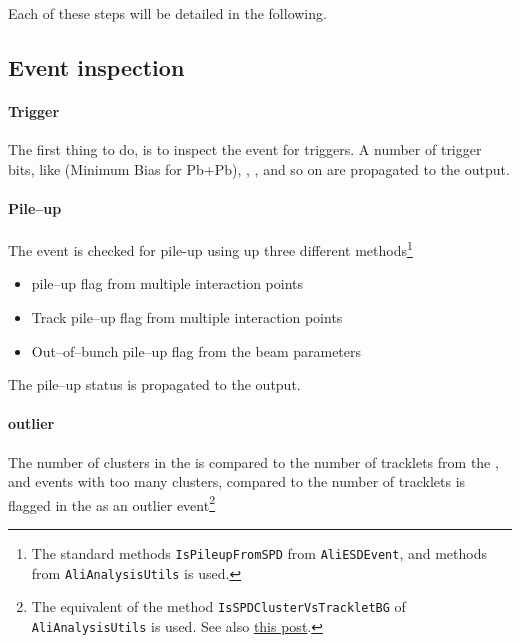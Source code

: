 Each of these steps will be detailed in the following. 

\subsection{Event inspection}
\label{sec:sub:event_inspection}

\paragraph{Trigger} 
The first thing to do, is to inspect the event for triggers.  A number
of trigger bits, like \INEL{} (Minimum Bias for Pb+Pb), \INELONE{},
\NSD{}, and so on are propagated to the \AOD{} output.

\paragraph{Pile--up} 
The event is checked for pile-up using up three different
methods\footnote{The standard methods \texttt{IsPileupFromSPD} from
  \texttt{AliESDEvent}, and methods from \texttt{AliAnalysisUtils} is
  used.} 
\begin{itemize}
\item \SPD{} pile--up flag from multiple interaction points
\item Track pile--up flag from multiple interaction points
\item Out--of--bunch pile--up flag from the beam parameters 
\end{itemize}
The pile--up status is propagated to the \AOD{} output.  

\paragraph{\SPD{} outlier} 
The number of clusters in the \SPD{} is compared to the number of
tracklets from the \SPD{}, and events with too many clusters, compared
to the number of tracklets is flagged in the \AOD{} as an outlier
event\footnote{The equivalent of the method
  \texttt{IsSPDClusterVsTrackletBG} of \texttt{AliAnalysisUtils} is
  used.  See also
  \href{https://groups.cern.ch/group/alice-analysis-operations/Lists/Archive/Flat.aspx?RootFolder=\%2Fgroup\%2Falice-analysis-operations\%2FLists\%2FArchive\%2FSPD\%20cluster-vs-tracklet\%20cut\%20for\%20background\%20rejection&FolderCTID=0x01200200726CA2ECC2B5D14F9300A07F2C08D3A2}{this
    post}.}

